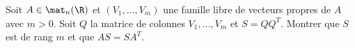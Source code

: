 \begin{enonce}
\begin{exercise}[ID={RMS133 E699},subtitle={Mines-Ponts PSI 2022},tags={},difficulty={}]
  Soit $A\in\mat_n(\R)$ et $(V_1,\dots,V_m)$ une famille libre de vecteurs propres de $A$ avec $m>0$.
  Soit $Q$ la matrice de colonnes $V_1,\dots, V_m$ et $S=Q Q^T$.
  Montrer que $S$ est de rang $m$ et que $AS = SA^T$.
\end{exercise}
\begin{solution}
\end{solution}
\end{enonce}
